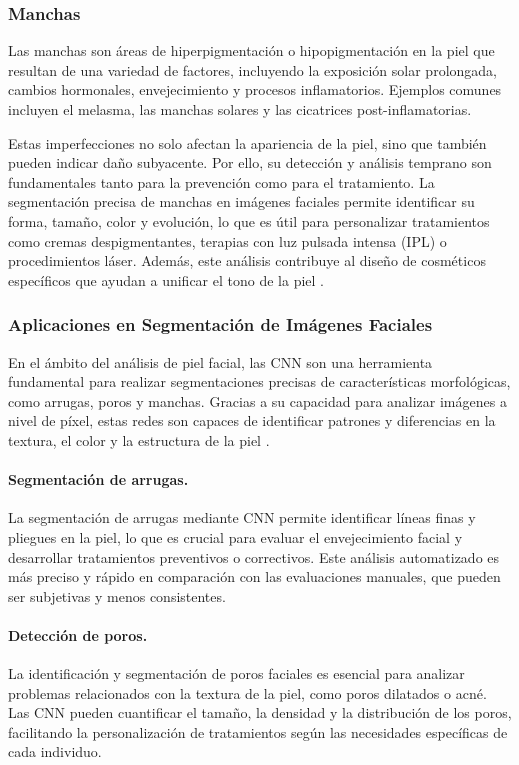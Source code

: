 \subsubsection{Manchas}
Las manchas son áreas de hiperpigmentación o hipopigmentación en la piel que resultan de una variedad de factores, incluyendo la exposición solar prolongada, cambios hormonales, envejecimiento y procesos inflamatorios. Ejemplos comunes incluyen el melasma, las manchas solares y las cicatrices post-inflamatorias.

Estas imperfecciones no solo afectan la apariencia de la piel, sino que también pueden indicar daño subyacente. Por ello, su detección y análisis temprano son fundamentales tanto para la prevención como para el tratamiento. La segmentación precisa de manchas en imágenes faciales permite identificar su forma, tamaño, color y evolución, lo que es útil para personalizar tratamientos como cremas despigmentantes, terapias con luz pulsada intensa (IPL) o procedimientos láser. Además, este análisis contribuye al diseño de cosméticos específicos que ayudan a unificar el tono de la piel \cite{autor2019manchas}.
\subsubsection{Aplicaciones en Segmentación de Imágenes Faciales}  
En el ámbito del análisis de piel facial, las CNN son una herramienta fundamental para realizar segmentaciones precisas de características morfológicas, como arrugas, poros y manchas. Gracias a su capacidad para analizar imágenes a nivel de píxel, estas redes son capaces de identificar patrones y diferencias en la textura, el color y la estructura de la piel \parencite{autor2021deeplab}.

\paragraph{Segmentación de arrugas.}  
La segmentación de arrugas mediante CNN permite identificar líneas finas y pliegues en la piel, lo que es crucial para evaluar el envejecimiento facial y desarrollar tratamientos preventivos o correctivos. Este análisis automatizado es más preciso y rápido en comparación con las evaluaciones manuales, que pueden ser subjetivas y menos consistentes.

\paragraph{Detección de poros.}  
La identificación y segmentación de poros faciales es esencial para analizar problemas relacionados con la textura de la piel, como poros dilatados o acné. Las CNN pueden cuantificar el tamaño, la densidad y la distribución de los poros, facilitando la personalización de tratamientos según las necesidades específicas de cada individuo.

